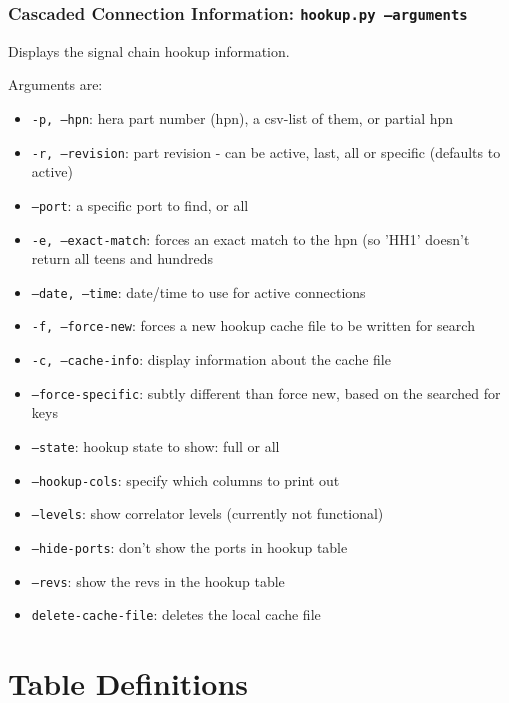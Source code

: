 \documentclass{article}
\begin{document}
{\subsubsection{Cascaded Connection Information:  {\tt hookup.py --arguments}}
Displays the signal chain hookup information.

Arguments are:
\begin{itemize}\setlength\itemsep{-.3em}
\item {\tt -p, --hpn}:  hera part number (hpn), a csv-list of them, or partial hpn
\item {\tt -r, --revision}: part revision - can be active, last, all or specific (defaults to active)
\item {\tt --port}: a specific port to find, or all
\item {\tt -e, --exact-match}: forces an exact match to the hpn (so 'HH1' doesn't return all teens and hundreds
\item {\tt --date, --time}:  date/time to use for active connections
\item {\tt -f, --force-new}:  forces a new hookup cache file to be written for search
\item {\tt -c, --cache-info}:  display information about the cache file
\item {\tt --force-specific}:  subtly different than force new, based on the searched for keys
\item {\tt --state}:  hookup state to show:  full or all
\item {\tt --hookup-cols}:  specify which columns to print out
\item {\tt --levels}:  show correlator levels (currently not functional)
\item {\tt --hide-ports}:  don't show the ports in hookup table
\item {\tt --revs}:  show the revs in the hookup table
\item {\tt delete-cache-file}:  deletes the local cache file
\end{itemize}

\newpage

\section{Table Definitions}
\label{sec:tables}

\vspace{5mm}
\etocsettocstyle{}{}
\localtableofcontents
\newpage

}
\end{document}
